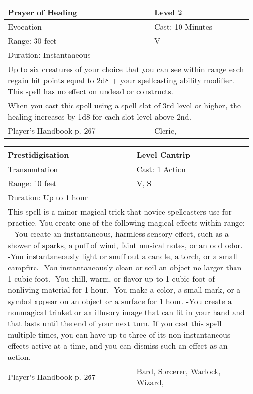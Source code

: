 \documentclass[11pt]{report}
\begin{document}
\begin{table}[H]
	\begin{tabular}{||p{6cm}|p{6cm}||}
		\hline\hline
		\bf{Prayer of Healing} & Level 2\\ \hline
		Evocation & Cast: 10 Minutes\\ \hline
		Range: 30 feet & V\\ \hline
		Duration: Instantaneous & \\ \hline
		\multicolumn{2}{||p{12cm}||}{Up to six creatures of your choice that you can see within range each regain hit points equal to 2d8 + your spellcasting ability modifier. This spell has no effect on undead or constructs.}\\ \hline
		\multicolumn{2}{||p{12cm}||}{When you cast this spell using a spell slot of 3rd level or higher, the healing increases by 1d8 for each slot level above 2nd.}\\ \hline
Player's Handbook p. 267 & Cleric, \\ \hline\hline
	\end{tabular}
\end{table}

\begin{table}[H]
	\begin{tabular}{||p{6cm}|p{6cm}||}
		\hline\hline
		\bf{Prestidigitation} & Level Cantrip\\ \hline
		Transmutation & Cast: 1 Action\\ \hline
		Range: 10 feet & V, S\\ \hline
		Duration: Up to 1 hour & \\ \hline
		\multicolumn{2}{||p{12cm}||}{This spell is a minor magical trick that novice spellcasters use for practice. You create one of the following magical effects within range:
 -You create an instantaneous, harmless sensory effect, such as a shower of sparks, a puff of wind, faint musical notes, or an odd odor. 
-You instantaneously light or snuff out a candle, a torch, or a small campfire. 
-You instantaneously clean or soil an object no larger than 1 cubic foot. 
-You chill, warm, or flavor up to 1 cubic foot of nonliving material for 1 hour. 
-You make a color, a small mark, or a symbol appear on an object or a surface for 1 hour. 
-You create a nonmagical trinket or an illusory image that can fit in your hand and that lasts until the end of your next turn. 
If you cast this spell multiple times, you can have up to three of its non-instantaneous effects active at a time, and you can dismiss such an effect as an action.}\\ \hline
Player's Handbook p. 267 & Bard, Sorcerer, Warlock, Wizard, \\ \hline\hline
	\end{tabular}
\end{table}
\end{document}
